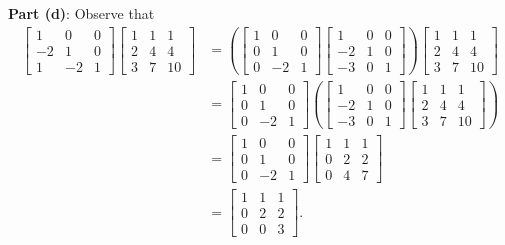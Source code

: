 \documentclass[11pt]{article}
\begin{document}
\textbf{Part (d)}: Observe that
\begin{align*}
	\begin{bmatrix} 1 & 0 & 0 \\ -2 & 1 & 0 \\ 1 & -2 & 1 \end{bmatrix} \begin{bmatrix} 1 & 1 & 1 \\ 2 & 4 & 4 \\ 3 & 7 & 10 \end{bmatrix} &= \left( \begin{bmatrix} 1 & 0 & 0 \\ 0 & 1 & 0 \\ 0 & -2 & 1 \end{bmatrix} \begin{bmatrix} 1 &  0 & 0 \\ -2 & 1 & 0 \\ -3 & 0 & 1 \end{bmatrix} \right) \begin{bmatrix} 1 & 1 & 1 \\ 2 & 4 & 4 \\ 3 & 7 & 10 \end{bmatrix} \\
	&= \begin{bmatrix} 1 & 0 & 0 \\ 0 & 1 & 0 \\ 0 & -2 & 1 \end{bmatrix} \left( \begin{bmatrix} 1 & 0 & 0 \\ -2 & 1 & 0 \\ -3 & 0 & 1 \end{bmatrix} \begin{bmatrix} 1 & 1 & 1 \\ 2 & 4 & 4 \\ 3 & 7 & 10 \end{bmatrix} \right) \\
	&= \begin{bmatrix} 1 & 0 & 0 \\ 0 & 1 & 0 \\ 0 & -2 & 1 \end{bmatrix} \begin{bmatrix} 1 & 1 & 1 \\ 0 & 2 & 2 \\ 0 & 4 & 7 \end{bmatrix} \\
	&= \begin{bmatrix} 1 & 1 & 1 \\ 0 & 2 & 2 \\ 0 & 0 & 3 \end{bmatrix}.
\end{align*}
\end{document}
